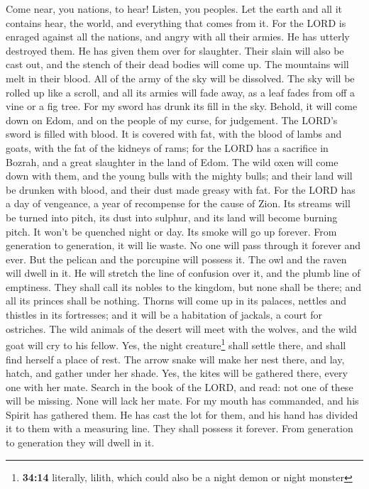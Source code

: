  Come near, you nations, to hear! Listen, you peoples. Let
the earth and all it contains hear, the world, and everything that comes
from it.  For the LORD is enraged against all the nations,
and angry with all their armies. He has utterly destroyed them. He has
given them over for slaughter.  Their slain will also be
cast out, and the stench of their dead bodies will come up. The
mountains will melt in their blood.  All of the army of
the sky will be dissolved. The sky will be rolled up like a scroll, and
all its armies will fade away, as a leaf fades from off a vine or a fig
tree.  For my sword has drunk its fill in the sky. Behold,
it will come down on Edom, and on the people of my curse, for judgement.
 The LORD's sword is filled with blood. It is covered with
fat, with the blood of lambs and goats, with the fat of the kidneys of
rams; for the LORD has a sacrifice in Bozrah, and a great slaughter in
the land of Edom.  The wild oxen will come down with them,
and the young bulls with the mighty bulls; and their land will be
drunken with blood, and their dust made greasy with fat. 
For the LORD has a day of vengeance, a year of recompense for the cause
of Zion.  Its streams will be turned into pitch, its dust
into sulphur, and its land will become burning pitch.  It
won't be quenched night or day. Its smoke will go up forever. From
generation to generation, it will lie waste. No one will pass through it
forever and ever.  But the pelican and the porcupine will
possess it. The owl and the raven will dwell in it. He will stretch the
line of confusion over it, and the plumb line of emptiness.
 They shall call its nobles to the kingdom, but none
shall be there; and all its princes shall be nothing. 
Thorns will come up in its palaces, nettles and thistles in its
fortresses; and it will be a habitation of jackals, a court for
ostriches.  The wild animals of the desert will meet with
the wolves, and the wild goat will cry to his fellow. Yes, the night
creature\footnote{\textbf{34:14} literally, lilith, which could also be
  a night demon or night monster} shall settle there, and shall find
herself a place of rest.  The arrow snake will make her
nest there, and lay, hatch, and gather under her shade. Yes, the kites
will be gathered there, every one with her mate.  Search
in the book of the LORD, and read: not one of these will be missing.
None will lack her mate. For my mouth has commanded, and his Spirit has
gathered them.  He has cast the lot for them, and his
hand has divided it to them with a measuring line. They shall possess it
forever. From generation to generation they will dwell in it.

